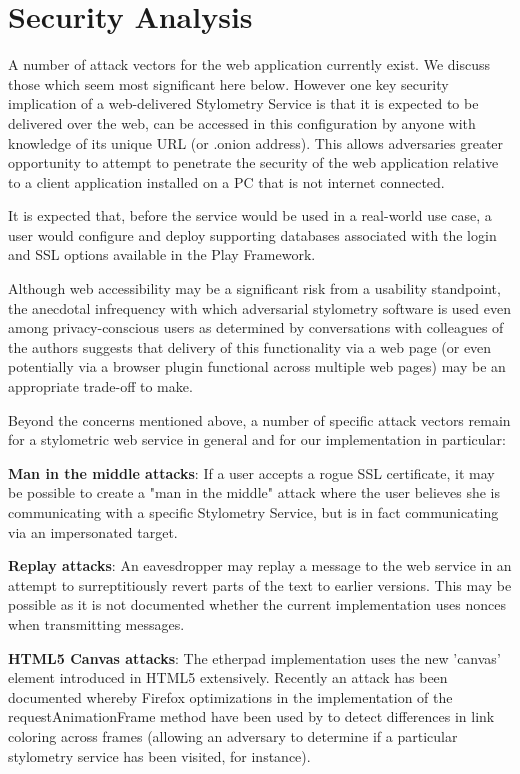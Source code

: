 \documentclass[letterpaper]{article}
\begin{document}
\section{Security Analysis}\label{sec:security}

A number of attack vectors for the web application currently exist. We
discuss those which seem most significant here below. However one key
security implication of a web-delivered Stylometry Service is that it
is expected to be delivered over the web, can be accessed in this
configuration by anyone with knowledge of its unique URL (or .onion
address). This allows adversaries greater opportunity to attempt to
penetrate the security of the web application relative to a client
application installed on a PC that is not internet connected.

It is expected that, before the service would be used in a real-world
use case, a user would configure and deploy supporting databases
associated with the login and SSL options available in the
Play Framework.

Although web accessibility may be a significant risk from a usability
standpoint, the anecdotal infrequency with which adversarial
stylometry software is used even among privacy-conscious users as
determined by conversations with colleagues of the authors
suggests that delivery of this functionality via a web page (or even
potentially via a browser plugin functional across multiple web pages)
may be an appropriate trade-off to make.

Beyond the concerns mentioned above, a number of specific attack
vectors remain for a stylometric web service in general and for our
implementation in particular:

{\bf Man in the middle attacks}: If a user accepts a rogue SSL
certificate, it may be possible to create a "man in the middle" attack
where the user believes she is communicating with a specific
Stylometry Service, but is in fact communicating via an impersonated
target.

{\bf Replay attacks}: An eavesdropper may replay a message to the
web service in an attempt to surreptitiously revert parts of the text to
earlier versions. This may be possible as it is not documented whether
the current implementation uses nonces when transmitting messages.

{\bf HTML5 Canvas attacks}: The etherpad implementation uses the new
'canvas' element introduced in HTML5 extensively. Recently an attack
has been documented \cite{BrowserTiming} whereby Firefox optimizations
in the implementation of the requestAnimationFrame method have been
used by to detect differences in link coloring across frames (allowing
an adversary to determine if a particular stylometry service has been
visited, for instance).
\end{document}
